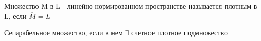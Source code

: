 \documentclass[12pt, a4paper]{report}
\begin{document}
\begin{definition}
    Множество M в L - линейно нормированном пространстве называется плотным в L, если \( \overline{M}= L  \) 
\end{definition}

\begin{definition}
    Сепарабельное множество, если в нем \( \exists  \) счетное плотное подмножество
\end{definition}




\ifdefined\mainfile
\else
    
\end{document}
